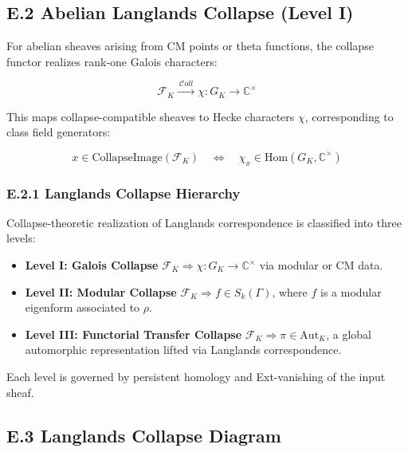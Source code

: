\documentclass[11pt]{article}
\begin{document}
\subsection*{E.2 Abelian Langlands Collapse (Level I)}

For abelian sheaves arising from CM points or theta functions, the collapse functor realizes rank-one Galois characters:

\[
\mathcal{F}_K \xrightarrow{\ \mathcal{C}oll\ } \chi: G_K \longrightarrow \mathbb{C}^\times
\]

This maps collapse-compatible sheaves to Hecke characters \( \chi \), corresponding to class field generators:

\[
x \in \text{CollapseImage}(\mathcal{F}_K) \quad \Longleftrightarrow \quad \chi_x \in \mathrm{Hom}(G_K, \mathbb{C}^\times)
\]

\subsubsection*{E.2.1 Langlands Collapse Hierarchy}

Collapse-theoretic realization of Langlands correspondence is classified into three levels:

\begin{itemize}
  \item \textbf{Level I: Galois Collapse}  
  \( \mathcal{F}_K \Rightarrow \chi : G_K \to \mathbb{C}^\times \)  
  via modular or CM data.

  \item \textbf{Level II: Modular Collapse}  
  \( \mathcal{F}_K \Rightarrow f \in S_k(\Gamma) \),  
  where \( f \) is a modular eigenform associated to \( \rho \).

  \item \textbf{Level III: Functorial Transfer Collapse}  
  \( \mathcal{F}_K \Rightarrow \pi \in \text{Aut}_K \),  
  a global automorphic representation lifted via Langlands correspondence.
\end{itemize}

Each level is governed by persistent homology and Ext-vanishing of the input sheaf.

\subsection*{E.3 Langlands Collapse Diagram}

\begin{center}
\end{center}
\end{document}
